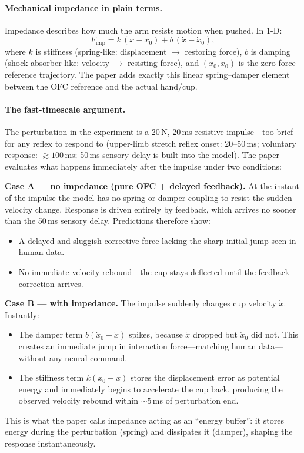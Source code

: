 \documentclass[11pt]{article}
\begin{document}
\paragraph{Mechanical impedance in plain terms.}
Impedance describes how much the arm resists motion when pushed.  In 1-D:
\[
  F_{\text{imp}} = k\,(x - x_0) + b\,(\dot{x} - \dot{x}_0),
\]
where $k$ is stiffness (spring-like: displacement $\to$ restoring force), $b$ is damping (shock-absorber-like: velocity $\to$ resisting force), and $(x_0, \dot{x}_0)$ is the zero-force reference trajectory.  The paper adds exactly this linear spring--damper element between the OFC reference and the actual hand/cup.

\paragraph{The fast-timescale argument.}
The perturbation in the experiment is a 20\,N, 20\,ms resistive impulse---too brief for any reflex to respond to (upper-limb stretch reflex onset: 20--50\,ms; voluntary response: $\gtrsim 100$\,ms; 50\,ms sensory delay is built into the model).  The paper evaluates what happens immediately after the impulse under two conditions:

\smallskip\noindent
\textbf{Case A --- no impedance (pure OFC + delayed feedback).}  At the instant of the impulse the model has no spring or damper coupling to resist the sudden velocity change.  Response is driven entirely by feedback, which arrives no sooner than the 50\,ms sensory delay.  Predictions therefore show:
\begin{itemize}[leftmargin=1.2em,topsep=2pt]
  \item A delayed and sluggish corrective force lacking the sharp initial jump seen in human data.
  \item No immediate velocity rebound---the cup stays deflected until the feedback correction arrives.
\end{itemize}

\noindent
\textbf{Case B --- with impedance.}  The impulse suddenly changes cup velocity $\dot x$.  Instantly:
\begin{itemize}[leftmargin=1.2em,topsep=2pt]
  \item The damper term $b(\dot x_0 - \dot x)$ spikes, because $\dot x$ dropped but $\dot x_0$ did not.  This creates an immediate jump in interaction force---matching human data---without any neural command.
  \item The stiffness term $k(x_0 - x)$ stores the displacement error as potential energy and immediately begins to accelerate the cup back, producing the observed velocity rebound within ${\sim}5$\,ms of perturbation end.
\end{itemize}
This is what the paper calls impedance acting as an ``energy buffer'': it stores energy during the perturbation (spring) and dissipates it (damper), shaping the response instantaneously.
\end{document}
